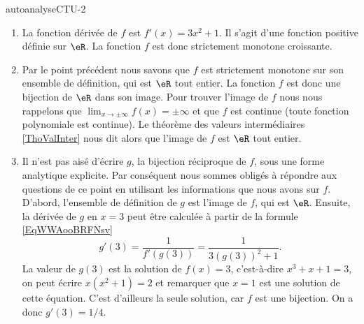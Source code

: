 
\begin{corrige}{autoanalyseCTU-2}


\begin{enumerate}
\item La fonction dérivée de $f$ est  $f'(x) = 3x^2 + 1$. Il s'agit d'une fonction positive définie sur $\eR$. La fonction $f$ est donc strictement monotone croissante. 
\item Par le point précédent nous savons que $f$ est strictement monotone sur son ensemble de définition, qui est $\eR$ tout entier. La fonction $f$ est donc une bijection de $\eR$ dans son image. Pour trouver l'image de $f$ nous nous rappelons que $\lim_{x\to \pm\infty} f(x) = \pm\infty$ et que $f$ est continue (toute fonction polynomiale est continue). Le théorème des valeurs intermédiaires \ref{ThoValInter} nous dit alors que l'image de $f$ est $\eR$ tout entier. 
\item Il n'est pas aisé d'écrire $g$, la bijection réciproque de $f$, sous une forme analytique explicite. Par conséquent nous sommes obligés à répondre aux questions de ce point en utilisant les informations que nous avons sur $f$. D'abord, l'ensemble de définition de $g$ est l'image de $f$, qui est $\eR$. Ensuite, la dérivée de $g$ en $x=3$ peut \^etre calculée à partir de la formule \eqref{EqWWAooBRFNsv} 
  \begin{equation*}
    g'(3) = \frac{1}{f'(g(3))} = \frac{1}{3(g(3))^2 +1}.
  \end{equation*}
La valeur de $g(3)$ est la solution de $f(x) = 3$, c'est-à-dire $x^3+x+1 = 3$, on peut écrire $x(x^2+1) = 2$ et remarquer que $x=1$ est une solution de cette équation. C'est d'ailleurs la seule solution, car $f$ est une bijection. On a donc $g'(3) = 1/4$.
\end{enumerate}

\end{corrige}   
